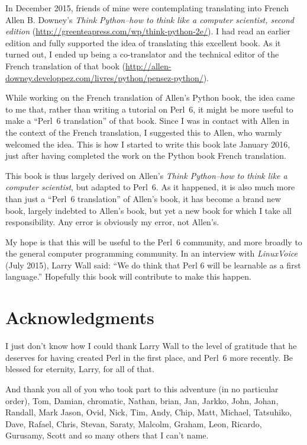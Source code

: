 In December 2015, friends of mine were contemplating translating 
into French Allen B. Downey's \emph{Think Python--how to think 
like a computer scientist, second edition} 
(\url{http://greenteapress.com/wp/think-python-2e/}). I had 
read an earlier edition and fully supported 
the idea of translating this excellent book. As it turned out, 
I ended up being a co-translator and the technical editor of 
the French translation of that book (\url{http://allen-downey.developpez.com/livres/python/pensez-python/}).

While working on the French translation of Allen's Python book, 
the idea came to me that, rather than writing a tutorial on 
Perl~6, it might be more useful to make a ``Perl~6 translation'' 
of that book. Since I was in contact with Allen in the context 
of the French translation, I suggested this to Allen, who 
warmly welcomed the idea. This is how I started to write this 
book late January 2016, just after having completed the 
work on the Python book French translation.

This book is thus largely derived on Allen's \emph{Think Python--how 
to think like a computer scientist}, but adapted to Perl~6. As 
it happened, it is also much more than just a ``Perl~6 
translation'' of Allen's book, it has become a brand new book, 
largely indebted to Allen's book, but yet a new book for which 
I take all responsibility. Any error is obviously my error, 
not Allen's.

My hope is that this will be useful to the Perl~6 community, and 
more broadly to the general computer programming community. In 
an interview with \emph{LinuxVoice} (July 2015), Larry Wall said: 
``We do think that Perl 6 will be learnable as a first language.''
Hopefully this book will contribute to make this happen. 

\section*{Acknowledgments}

I just don't know how I could thank Larry Wall to the level of 
gratitude that he deserves for having created Perl in the first 
place, and Perl~6 more recently. Be blessed for eternity, Larry, 
for all of that. 

And thank you all of you who took part to this 
adventure (in no particular order), Tom, Damian, 
chromatic, Nathan, brian, Jan, Jarkko, John, Johan, Randall, 
Mark Jason, Ovid, Nick, Tim, Andy, Chip, Matt, Michael, Tatsuhiko, 
Dave, Rafael, Chris, Stevan, Saraty, Malcolm, Graham, Leon, 
Ricardo, Gurusamy, Scott and so many others that I can't name.  

